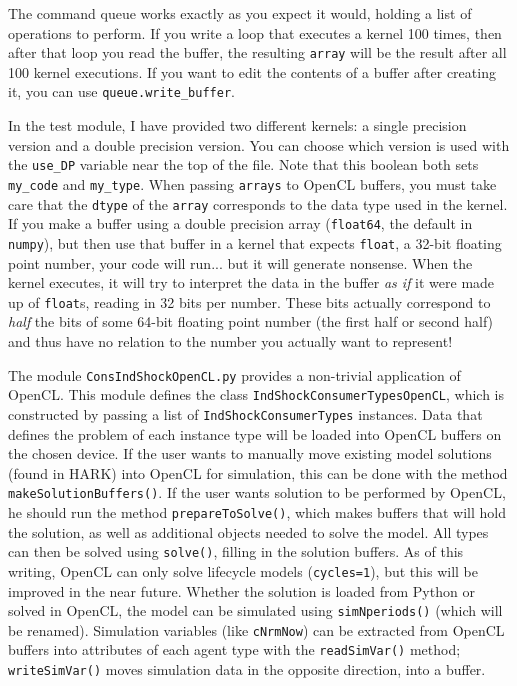 \documentclass[12pt,pdftex,letterpaper]{article}
\begin{document}
The command queue works exactly as you expect it would, holding a list of operations to perform.  If you write a loop that executes a kernel 100 times, then after that loop you read the buffer, the resulting \texttt{array} will be the result after all 100 kernel executions.  If you want to edit the contents of a buffer after creating it, you can use \texttt{queue.write\_buffer}.

In the test module, I have provided two different kernels: a single precision version and a double precision version.  You can choose which version is used with the \texttt{use\_DP} variable near the top of the file.  Note that this boolean both sets \texttt{my\_code} and \texttt{my\_type}.  When passing \texttt{arrays} to OpenCL buffers, you must take care that the \texttt{dtype} of the \texttt{array} corresponds to the data type used in the kernel.  If you make a buffer using a double precision array (\texttt{float64}, the default in \texttt{numpy}), but then use that buffer in a kernel that expects \texttt{float}, a 32-bit floating point number, your code will run... but it will generate nonsense.  When the kernel executes, it will try to interpret the data in the buffer \textit{as if} it were made up of \texttt{float}s, reading in 32 bits per number.  These bits actually correspond to \textit{half} the bits of some 64-bit floating point number (the first half or second half) and thus have no relation to the number you actually want to represent!

The module \texttt{ConsIndShockOpenCL.py} provides a non-trivial application of OpenCL.  This module defines the class \texttt{IndShockConsumerTypesOpenCL}, which is constructed by passing a list of \texttt{IndShockConsumerTypes} instances.  Data that defines the problem of each instance type will be loaded into OpenCL buffers on the chosen device.  If the user wants to manually move existing model solutions (found in HARK) into OpenCL for simulation, this can be done with the method \texttt{makeSolutionBuffers()}.  If the user wants solution to be performed by OpenCL, he should run the method \texttt{prepareToSolve()}, which makes buffers that will hold the solution, as well as additional objects needed to solve the model.  All types can then be solved using \texttt{solve()}, filling in the solution buffers.  As of this writing, OpenCL can only solve lifecycle models (\texttt{cycles=1}), but this will be improved in the near future.  Whether the solution is loaded from Python or solved in OpenCL, the model can be simulated using \texttt{simNperiods()} (which will be renamed).  Simulation variables (like \texttt{cNrmNow}) can be extracted from OpenCL buffers into attributes of each agent type with the \texttt{readSimVar()} method; \texttt{writeSimVar()} moves simulation data in the opposite direction, into a buffer.
\end{document}
